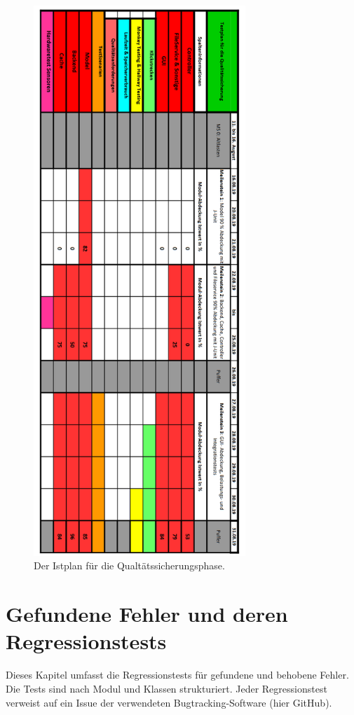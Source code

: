 \documentclass[parskip=full]{scrartcl}
\begin{document}
\begin{figure}[htbp]
	\begin{center}
		\includegraphics[width = 8cm]{Grafiken/istplan.png}
		\caption{Der Istplan für die Qualtätssicherungsphase.}
		\label{istplan}
	\end{center}
\end{figure}


\clearpage
\section{Gefundene Fehler und deren Regressionstests} \label{regression}

Dieses Kapitel umfasst die Regressionstests für gefundene und behobene Fehler. Die Tests sind nach Modul und Klassen strukturiert. Jeder Regressionstest verweist auf ein Issue der verwendeten Bugtracking-Software (hier GitHub).
\end{document}
